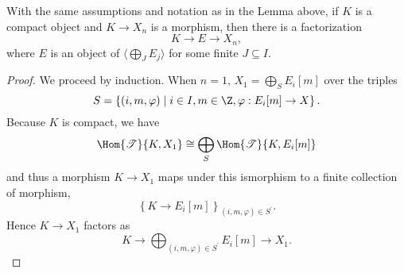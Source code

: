 \documentclass[10pt]{amsart}
\begin{document}
\begin{lem}\label{hocolimfactorization}
  With the same assumptions and notation as in the Lemma above, if $K$ is a compact object and $K \rightarrow X_n$ is a morphism, then there is a factorization 
  $$K \rightarrow E \rightarrow X_n,$$
  where $E$ is an object of $\langle \bigoplus_{J}E_j \rangle$ for some finite $J \subseteq I$.
  \begin{proof}
    We proceed by induction.
    When $n = 1$, $X_1 = \bigoplus_S E_i[m]$ over the triples
    $$S = \left\{(i,m,\varphi) \;\middle\vert\; i \in I, m \in \Z, \varphi : E_i[m] \rightarrow X\right\}.$$
    Because $K$ is compact, we have
    $$\Hom{\T}{K,X_1} \cong \bigoplus_S\Hom{\T}{K, E_i[m]}$$
    and thus a morphism $K \rightarrow X_1$ maps under this ismorphism to a finite collection of morphism, $$\left\{K \rightarrow E_i[m]\right\}_{(i,m,\varphi) \in S^\prime}.$$
    Hence $K \rightarrow X_1$ factors as
    $$K \rightarrow \bigoplus_{(i,m,\varphi) \in S^\prime}E_i[m] \rightarrow X_1.$$


\end{proof}
\end{lem}
\end{document}
